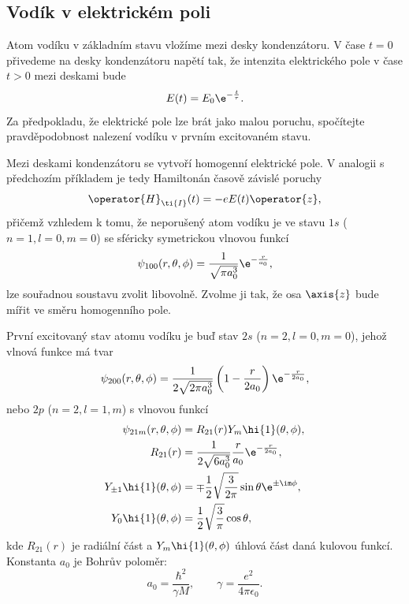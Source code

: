 \subsection{Vodík v elektrickém poli}
Atom vodíku v základním stavu vložíme mezi desky kondenzátoru.
V čase $t=0$ přivedeme na desky kondenzátoru napětí tak, že intenzita elektrického pole v čase $t>0$ mezi deskami bude
\begin{equation}
    E(t)=E_0\e^{-\frac{t}{\tau}}.
\end{equation}
Za předpokladu, že elektrické pole lze brát jako malou poruchu, spočítejte pravděpodobnost nalezení vodíku v prvním excitovaném stavu.
	
\begin{solution}
    Mezi deskami kondenzátoru se vytvoří homogenní elektrické pole.
    V analogii s předchozím příkladem je tedy Hamiltonán časově závislé poruchy 
    \begin{equation}
        \operator{H}_{\ti{I}}(t)=-eE(t)\operator{z},
    \end{equation}
    přičemž vzhledem k tomu, že neporušený atom vodíku je ve stavu $1s$ ($n=1, l=0, m=0$) se sféricky symetrickou vlnovou funkcí
    \begin{equation}
        \psi_{100}(r,\theta,\phi)=\frac{1}{\sqrt{\pi a_{0}^{3}}}\e^{-\frac{r}{a_{0}}},
    \end{equation}
    lze souřadnou soustavu zvolit libovolně.
    Zvolme ji tak, že osa $\axis{z}$ bude mířit ve směru homogenního pole.

    První excitovaný stav atomu vodíku je buď stav $2s$ ($n=2, l=0, m=0$), jehož vlnová funkce má tvar
    \begin{equation}
        \psi_{200}(r,\theta,\phi)=\frac{1}{2\sqrt{2\pi a_{0}^{3}}}\left(1-\frac{r}{2a_{0}}\right)\e^{-\frac{r}{2a_{0}}},
    \end{equation}
    nebo $2p$ ($n=2, l=1, m$) s vlnovou funkcí
    \begin{subequations}
        \begin{align}
            \psi_{21m}(r,\theta,\phi)&=R_{21}(r)Y_{m}\hi{1}(\theta,\phi),\\
            R_{21}(r)&=\frac{1}{2\sqrt{6a_{0}^{3}}}\frac{r}{a_{0}}\e^{-\frac{r}{2a_{0}}},\\
            Y_{\pm1}\hi{1}(\theta,\phi)&=\mp\frac{1}{2}\sqrt{\frac{3}{2\pi}}\sin{\theta}\e^{\pm\im\phi},\\
            Y_{0}\hi{1}(\theta,\phi)&=\frac{1}{2}\sqrt{\frac{3}{\pi}}\cos{\theta},
        \end{align}            
    \end{subequations}
    kde $R_{21}(r)$ je radiální část a $Y_{m}\hi{1}(\theta,\phi)$ úhlová část daná kulovou funkcí.
    Konstanta $a_{0}$ je Bohrův poloměr:
    \begin{equation}
        a_{0}=\frac{\hbar^{2}}{\gamma M},\qquad \gamma=\frac{e^{2}}{4\pi\epsilon_{0}}.
    \end{equation}


\end{solution}
